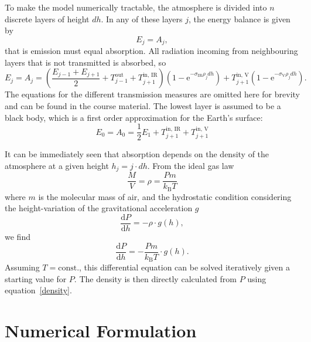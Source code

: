 \documentclass[a4paper,DIV=12,english]{scrartcl}
\begin{document}
To make the model numerically tractable, the atmosphere is divided into $n$ discrete layers of height $dh$. In any of these layers $j$, the energy balance is given by
\begin{equation}
    E_j = A_j,
\end{equation}
that is emission must equal absorption. All radiation incoming from neighbouring layers that is not transmitted is absorbed, so 
\begin{equation}\label{emission}
    E_j = A_j = \left(\frac{E_{j-1} + E_{j+1}}{2} + T_{j-1}^{\text{out}} + T_{j+1}^{\text{in, IR}}\right)\left(1 - \text{e}^{-\sigma_\text{IR}\rho_j dh}\right) + T_{j+1}^{\text{in, V}}\left(1 - \text{e}^{-\sigma_\text{V}\rho_j dh}\right).
\end{equation}
The equations for the different transmission measures are omitted here for brevity and can be found in the course material. The lowest layer is assumed to be a black body, which is a first order approximation for the Earth's surface:
\begin{equation}
    E_0 = A_0 = \frac{1}{2}E_1 + T_{j+1}^{\text{in, IR}} + T_{j+1}^{\text{in, V}}
\end{equation}

It can be immediately seen that absorption depends on the density of the atmosphere at a given height $h_j = j\cdot dh$. From the ideal gas law
\begin{equation}\label{density}
    \frac{M}{V} = \rho = \frac{Pm}{k_\text{B}T}
\end{equation} 
where $m$ is the molecular mass of air, and the hydrostatic condition considering the height-variation of the gravitational acceleration $g$
\begin{equation}
    \frac{\text{d}P}{\text{d}h} = -\rho \cdot g(h),
\end{equation}
we find
\begin{equation}\label{ODE}
    \frac{\text{d}P}{\text{d}h} = -\frac{Pm}{k_\text{B}T} \cdot g(h).
\end{equation}
Assuming $T=\text{const.}$, this differential equation can be solved iteratively given a starting value for $P$. The density is then directly calculated from $P$ using equation~\eqref{density}.

\section{Numerical Formulation}
\end{document}
